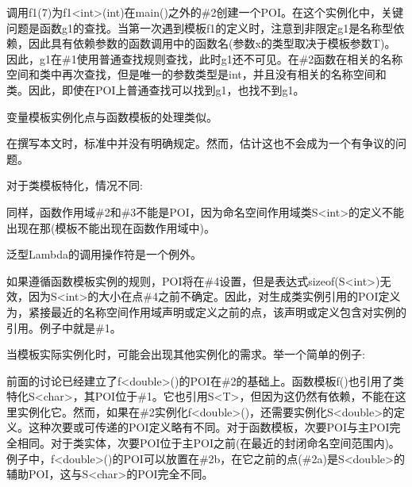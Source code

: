 调用f1(7)为f1<int>(int)在main()之外的\#2创建一个POI。在这个实例化中，关键问题是函数g1的查找。当第一次遇到模板f1的定义时，注意到非限定g1是名称型依赖，因此具有依赖参数的函数调用中的函数名(参数x的类型取决于模板参数T)。因此，g1在\#1使用普通查找规则查找，此时g1还不可见。在\#2函数在相关的名称空间和类中再次查找，但是唯一的参数类型是int，并且没有相关的名称空间和类。因此，即使在POI上普通查找可以找到g1，也找不到g1。

变量模板实例化点与函数模板的处理类似。

\begin{notice}
在撰写本文时，标准中并没有明确规定。然而，估计这也不会成为一个有争议的问题。
\end{notice}

对于类模板特化，情况不同:


同样，函数作用域\#2和\#3不能是POI，因为命名空间作用域类S<int>的定义不能出现在那(模板不能出现在函数作用域中)。

\begin{notice}
泛型Lambda的调用操作符是一个例外。
\end{notice}

如果遵循函数模板实例的规则，POI将在\#4设置，但是表达式sizeof(S<int>)无效，因为S<int>的大小在点\#4之前不确定。因此，对生成类实例引用的POI定义为，紧接最近的名称空间作用域声明或定义之前的点，该声明或定义包含对实例的引用。例子中就是\#1。

当模板实际实例化时，可能会出现其他实例化的需求。举一个简单的例子:


前面的讨论已经建立了f<double>()的POI在\#2的基础上。函数模板f()也引用了类特化S<char>，其POI位于\#1。它也引用S<T>，但因为这仍然有依赖，不能在这里实例化它。然而，如果在\#2实例化f<double>()，还需要实例化S<double>的定义。这种次要或可传递的POI定义略有不同。对于函数模板，次要POI与主POI完全相同。对于类实体，次要POI位于主POI之前(在最近的封闭命名空间范围内)。例子中，f<double>()的POI可以放置在\#2b，在它之前的点(\#2a)是S<double>的辅助POI，这与S<char>的POI完全不同。


